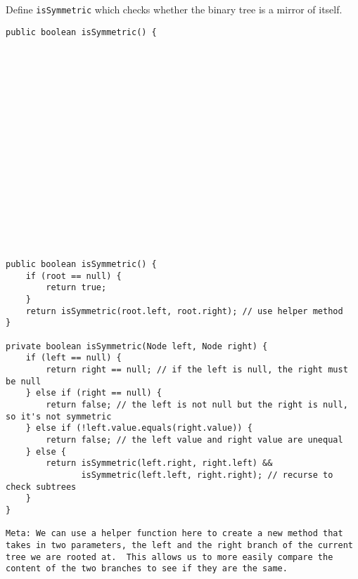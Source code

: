 \question Define \texttt{isSymmetric} which checks whether the binary tree is a mirror of itself.

\ifprintanswers\else
\begin{lstlisting}
public boolean isSymmetric() {



















\end{lstlisting}
\fi

\begin{solution}
\begin{lstlisting}
public boolean isSymmetric() {
    if (root == null) {
        return true;
    }
    return isSymmetric(root.left, root.right); // use helper method
}

private boolean isSymmetric(Node left, Node right) {
    if (left == null) {
        return right == null; // if the left is null, the right must be null
    } else if (right == null) {
        return false; // the left is not null but the right is null, so it's not symmetric
    } else if (!left.value.equals(right.value)) {
        return false; // the left value and right value are unequal
    } else {
        return isSymmetric(left.right, right.left) && 
               isSymmetric(left.left, right.right); // recurse to check subtrees
    }
}

Meta: We can use a helper function here to create a new method that takes in two parameters, the left and the right branch of the current tree we are rooted at.  This allows us to more easily compare the content of the two branches to see if they are the same.
\end{lstlisting}
\end{solution}